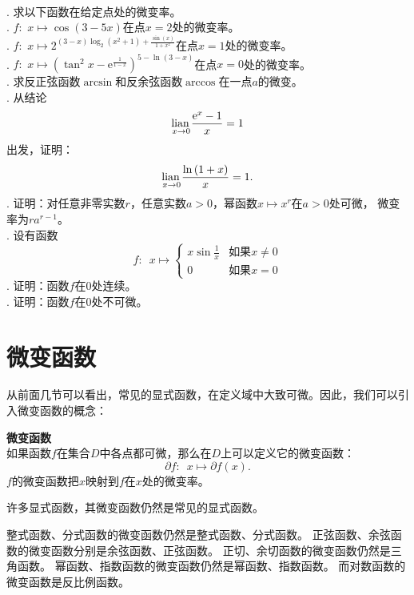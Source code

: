 \documentclass[12pt,UTF8]{ctexbook}
\begin{document}
\begin{xt}
    \mbox{} \\
    . 求以下函数在给定点处的微变率。\\
    . $f: \,\, x \mapsto \cos{(3 - 5x)}$在点$x = 2$处的微变率。\\
    . $f: \,\, x \mapsto 2^{(3 - x)\log_2\left(x^2 + 1\right) + \frac{\sin(x)}{1 + x^2}}$在点$x = 1$处的微变率。\\
    . $f: \,\, x \mapsto (\tan^2{x} - \mathrm{e}^{\frac{1}{1-x}})^{5 - \ln(3 - x)}$在点$x = 0$处的微变率。\\
    . 求反正弦函数$\arcsin$和反余弦函数$\arccos$在一点$a$的微变。\\
    . 从结论
    $$ \underset{x\to 0}{\operatorname{lian}\,} \frac{\mathrm{e}^x - 1}{x} = 1$$
    \indent 出发，证明：
    $$ \underset{x\to 0}{\operatorname{lian}\,} \frac{\ln{(1 + x)}}{x} = 1.$$
    . 证明：对任意非零实数$r$，任意实数$a>0$，幂函数$x \mapsto x^r$在$a>0$处可微，
    微变率为$ra^{r-1}$。\\
    . 设有函数
    $$f: \,\,\, x \mapsto \left\{
        \begin{array}{cl}
            x\sin{\frac{1}{x}}  & \mbox{如果}x \neq 0 \\
            0 & \mbox{如果}x = 0
        \end{array}\right.
    $$
    . 证明：函数$f$在$0$处连续。\\
    . 证明：函数$f$在$0$处不可微。
\end{xt}

\section{微变函数}
从前面几节可以看出，常见的显式函数，在定义域中大致可微。因此，我们可以引入微变函数的概念：
\begin{df}{\textbf{微变函数}}\label{df:2-4-0}
    \mbox{} \\
    如果函数$f$在集合$D$中各点都可微，那么在$D$上可以定义它的微变函数：
    $$ \partial f : \,\,\, x \mapsto \partial f(x). $$
    $f$的微变函数把$x$映射到$f$在$x$处的微变率。
\end{df}

许多显式函数，其微变函数仍然是常见的显式函数。

整式函数、分式函数的微变函数仍然是整式函数、分式函数。
正弦函数、余弦函数的微变函数分别是余弦函数、正弦函数。
正切、余切函数的微变函数仍然是三角函数。
幂函数、指数函数的微变函数仍然是幂函数、指数函数。
而对数函数的微变函数是反比例函数。
\end{document}

